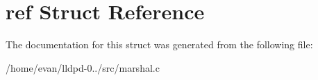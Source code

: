 \section{ref \-Struct \-Reference}
\label{structref}


\-The documentation for this struct was generated from the following file\-:\begin{DoxyCompactItemize}
\item 
/home/evan/lldpd-\/0../src/marshal.\-c\end{DoxyCompactItemize}
